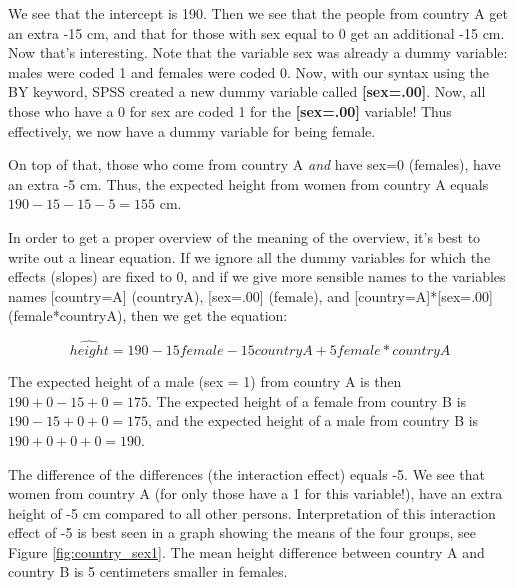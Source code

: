 We see that the intercept is 190. Then we see that the people from country A get an extra -15 cm, and that for those with sex equal to 0 get an additional -15 cm. Now that's interesting. Note that the variable sex was already a dummy variable: males were coded 1 and females were coded 0. Now, with our syntax using the BY keyword, SPSS created a new dummy variable called \textbf{[sex=.00]}. Now, all those who have a 0 for sex are coded 1 for the \textbf{[sex=.00]} variable! Thus effectively, we now have a dummy variable for being female. 

On top of that, those who come from country A \textit{and} have sex=0 (females), have an extra -5 cm. Thus, the expected height from women from country A equals $190-15-15-5=155$ cm. 

In order to get a proper overview of the meaning of the overview, it's best to write out a linear equation. If we ignore all the dummy variables for which the effects (slopes) are fixed to 0, and if we give more sensible names to the variables names [country=A] (countryA), [sex=.00] (female), and [country=A]*[sex=.00] (female*countryA), then we get the equation:

\begin{equation}
\widehat{height}= 190  - 15 female - 15 countryA + 5 female*countryA
\end{equation}


The expected height of a male (sex = 1) from country A is then $190  + 0 - 15 + 0 = 175$. The expected height of a female from country B is $190 -15 + 0 +0 =175$, and the expected height of a male from country B is $190 + 0 + 0 + 0 = 190$. 

The difference of the differences (the interaction effect) equals -5. We see that women from country A (for only those have a 1 for this variable!), have an extra height of -5 cm compared to all other persons. Interpretation of this interaction effect of -5 is best seen in a graph showing the means of the four groups, see Figure \ref{fig:country_sex1}. The mean height difference between country A and country B is 5 centimeters smaller in females.

\begin{knitrout}
\color{fgcolor}\begin{kframe}


{\ttfamily\noindent\bfseries{}}

{\ttfamily\noindent\bfseries{}}

{\ttfamily\noindent\bfseries{}}\end{kframe}
\end{knitrout}


